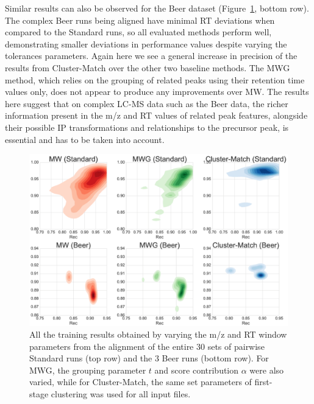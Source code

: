 Similar results can also be observed for the Beer dataset (Figure~\ref{fig:training-results}, bottom row). The complex Beer runs being aligned have minimal RT deviations when compared to the Standard runs, so all evaluated methods perform well, demonstrating smaller deviations in performance values despite varying the tolerances parameters. Again here we see a general increase in precision of the results from Cluster-Match over the other two baseline methods. The MWG method, which relies on the grouping of related peaks using their retention time values only, does not appear to produce any improvements over MW. The results here suggest that on complex LC-MS data such as the Beer data, the richer information present in the m/z and RT values of related peak features, alongside their possible IP transformations and relationships to the precursor peak, is essential and has to be taken into account.

\begin{figure}[!htbp]
\centering
\centering\includegraphics[width=1.0\linewidth]{05-precursor-cluster/figures/fig2.pdf}
\caption{\label{fig:training-results} All the training results obtained by varying the m/z and RT window parameters from the alignment of the entire 30 sets of pairwise Standard runs (top row) and the 3 Beer runs (bottom row). For MWG, the grouping parameter $t$ and score contribution $\alpha$ were also varied, while for Cluster-Match, the same set parameters of first-stage clustering was used for all input files.}
\end{figure}

